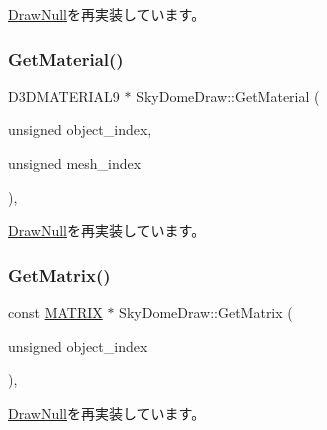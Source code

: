 \mbox{\hyperlink{class_draw_null_a8496ed1b1f765a331a8f1704122b8ca4}{Draw\+Null}}を再実装しています。

\mbox{\label{class_sky_dome_draw_acbc487d912b464474ae6f1afd7d6bb74}} 
\subsubsection{\texorpdfstring{Get\+Material()}{GetMaterial()}}
{\footnotesize\ttfamily D3\+D\+M\+A\+T\+E\+R\+I\+A\+L9 $\ast$ Sky\+Dome\+Draw\+::\+Get\+Material (\begin{DoxyParamCaption}\item[{unsigned}]{object\+\_\+index,  }\item[{unsigned}]{mesh\+\_\+index }\end{DoxyParamCaption})\hspace{0.3cm}{\ttfamily [override]}, {\ttfamily [virtual]}}



\mbox{\hyperlink{class_draw_null_a84969d22d3436986f214e9896fe44fc6}{Draw\+Null}}を再実装しています。

\mbox{\label{class_sky_dome_draw_ab947a3d43975a6d95149bc112c08ce05}} 
\subsubsection{\texorpdfstring{Get\+Matrix()}{GetMatrix()}}
{\footnotesize\ttfamily const \mbox{\hyperlink{_vector3_d_8h_a032295cd9fb1b711757c90667278e744}{M\+A\+T\+R\+IX}} $\ast$ Sky\+Dome\+Draw\+::\+Get\+Matrix (\begin{DoxyParamCaption}\item[{unsigned}]{object\+\_\+index }\end{DoxyParamCaption})\hspace{0.3cm}{\ttfamily [override]}, {\ttfamily [virtual]}}



\mbox{\hyperlink{class_draw_null_adede079e9c11a756090740b20bb43022}{Draw\+Null}}を再実装しています。

\mbox{\label{class_sky_dome_draw_a7ecd8d4b987e4d58a247d3438a45f9d4}} 
